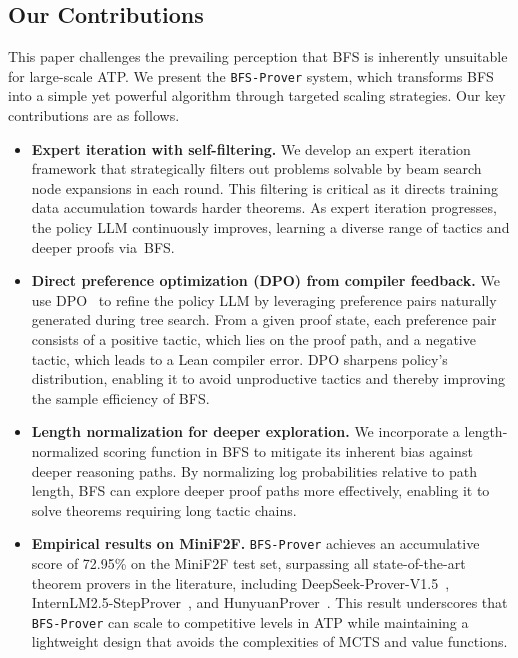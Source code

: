 \documentclass[10pt,english]{article}
\begin{document}
\subsection{Our Contributions}
This paper challenges the prevailing perception that BFS is inherently unsuitable for large-scale ATP. We present the \texttt{BFS-Prover} system, which transforms BFS into a simple yet powerful algorithm through targeted scaling strategies. Our key contributions are as follows.

\begin{itemize}
\item \textbf{Expert iteration with self-filtering.}
We develop an expert iteration~\citep{expert-iteration} framework that strategically filters out problems solvable by beam search~\citep{beam-search} node expansions in each round. This filtering is critical as it directs training data accumulation towards harder theorems. As expert iteration progresses, the policy LLM continuously improves, learning a diverse range of tactics and deeper proofs via~BFS.

\item \textbf{Direct preference optimization (DPO) from compiler feedback.}
We use DPO~\citep{dpo} to refine the policy LLM by leveraging preference pairs naturally generated during tree search. From a given proof state, each preference pair consists of a positive tactic, which lies on the proof path, and a negative tactic, which leads to a Lean compiler error. DPO sharpens policy's distribution, enabling it to avoid unproductive tactics and thereby improving the sample efficiency of BFS.

\item \textbf{Length normalization for deeper exploration.}
We incorporate a length-normalized scoring function in BFS to mitigate its inherent bias against deeper reasoning paths. By normalizing log probabilities relative to path length, BFS can explore deeper proof paths more effectively, enabling it to solve theorems requiring long tactic chains.

\item \textbf{Empirical results on MiniF2F.}
\texttt{BFS-Prover} achieves an accumulative score of 72.95\% on the MiniF2F test set, surpassing all state-of-the-art theorem provers in the literature, including DeepSeek-Prover-V1.5~\citep{deepseek-proer-v1.5}, InternLM2.5-StepProver~\citep{intern-prover-v2.5}, and HunyuanProver~\citep{hunyuanprover}. This result underscores that \texttt{BFS-Prover} can scale to competitive levels in ATP while maintaining a lightweight design that avoids the complexities of MCTS and value functions.
\end{itemize}
\end{document}
